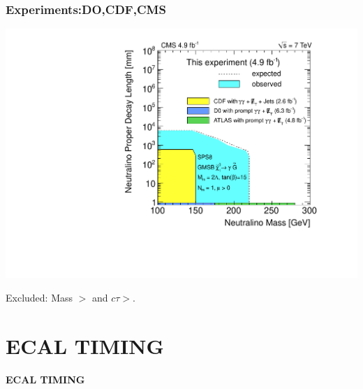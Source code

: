 \documentclass{beamer}
\begin{document}
\begin{frame}
\frametitle{\Huge{Experiments:DO,CDF,CMS }}

\begin{minipage}[b]{\paperwidth}
\begin{tcolorbox}[colback=UNL@Cream!5,colframe=UNL@Cream!40,title=\textcolor{UMN@Maroon}{\textbf{CMS, CDF, DO}}]
\includegraphics[height=0.55\textwidth,width=0.95\linewidth]{THESISPLOTS/2D_exclusion.pdf}
 \end{tcolorbox}
 Excluded: Mass $>  $ and $c\tau >  $.
\end{minipage}
\end{frame}




\section{ECAL TIMING}
{
\begin{frame}
   \begin{center}
    \textcolor{UMN@Maroon}{\huge{\textbf{ECAL TIMING}}}
   \end{center}
\end{frame}
}
\end{document}
